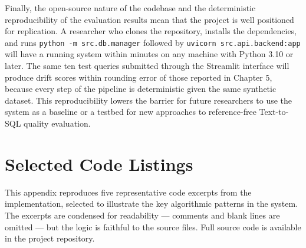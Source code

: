 \documentclass[12pt,a4paper]{report}
\begin{document}
Finally, the open-source nature of the codebase and the deterministic reproducibility of the evaluation results mean that the project is well positioned for replication. A researcher who clones the repository, installs the dependencies, and runs \texttt{python -m src.db.manager} followed by \texttt{uvicorn src.api.backend:app} will have a running system within minutes on any machine with Python 3.10 or later. The same ten test queries submitted through the Streamlit interface will produce drift scores within rounding error of those reported in Chapter 5, because every step of the pipeline is deterministic given the same synthetic dataset. This reproducibility lowers the barrier for future researchers to use the system as a baseline or a testbed for new approaches to reference-free Text-to-SQL quality evaluation.






\appendix



\chapter{Selected Code Listings}
\label{apndx:code}

This appendix reproduces five representative code excerpts from the implementation, selected to illustrate the key algorithmic patterns in the system. The excerpts are condensed for readability — comments and blank lines are omitted — but the logic is faithful to the source files. Full source code is available in the project repository.
\end{document}
